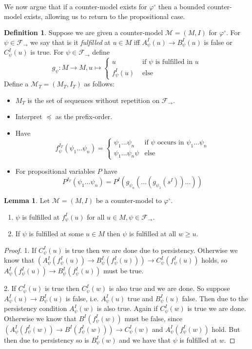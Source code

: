 \documentclass[a4paper,12pt]{report}
\theoremstyle{definition}
\theoremstyle{definition}
\theoremstyle{definition}
\newtheorem{lemma}[theorem]{Lemma}
\theoremstyle{definition}
\theoremstyle{definition}
\newtheorem{definition}[theorem]{Definition}
\theoremstyle{definition}
\theoremstyle{definition}
\begin{document}
	We now argue that if a counter-model exists for $\varphi^\circ$ then a bounded counter-model exists, allowing us to return to the propositional case.
	
	\begin{definition}
		Suppose we are given a counter-model $\mathcal M = (M, I)$ for $\varphi^\circ$. For $\psi\in\mathcal F_\to$ we say that is it \textit{fulfilled} at $u\in M$ iff $A_\psi^I(u)\to B_\psi^I(u)$ is false or $C_\psi^I(u)$ is true. For $\psi\in\mathcal F_\to$ define $$g_\psi : M\to M, u\mapsto\begin{cases}
			u&\text{ if $\psi$ is fulfilled in $u$}\\
			f^I_\psi(u)&\text{ else}		
		\end{cases}$$Define a $\mathcal M_T = (M_T, I_T)$ as follows:
	\begin{itemize}
		\item $M_T$ is the set of sequences without repetition on $\mathcal F_\to$.
		\item Interpret $\preceq$ as the prefix-order.
		\item Have $$f_\psi^{I_T}(\psi_1\dots\psi_n) = \begin{cases}
			\psi_1\dots\psi_n&\text{if $\psi$ occurs in $\psi_1\dots\psi_n$}\\
			\psi_1\dots\psi_n\psi&\text{else}			
		\end{cases}$$
		\item For propositional variables $P$ have $$P^{I_T}(\psi_1\dots \psi_n) = P^I(g_{\psi_n}(\dots(g_{\psi_1}(s^I))\dots))$$
	\end{itemize}
	\end{definition}
	\begin{lemma}
		Let $\mathcal M = (M, I)$ be a counter-model to $\mathcal \varphi^\circ$.
		\begin{enumerate}
			\item $\psi$ is fulfilled at $f_\psi^I(u)$ for all $u\in M, \psi\in\mathcal F_\to$.
			\item If $\psi$ is fulfilled at some $u\in M$ then $\psi$ is fulfilled at all $w\geq u$.
		\end{enumerate}
		
	\end{lemma}

	\begin{proof}
		1. If $C_\psi^I(u)$ is true then we are done due to persistency. Otherwise we know that $(A_\psi^I(f_\psi^I(u))\to B_\psi^I(f_\psi^I(u)))\to C_\psi^I(f_\psi^I(u))$ holds, so $A_\psi^I(f_\psi^I(u))\to B_\psi^I(f_\psi^I(u))$ must be true.
		
		2. If $C_\psi^I(u)$ is true then $C_\psi^I(w)$ is also true and we are done. So suppose $A_\psi^I(u)\to B_\psi^I(u)$ is false, i.e. $A_\psi^I(u)$ true and $B_\psi^I(u)$ false. Then due to the persistency condition $A_\psi^I(w)$ is also true. Again if $C_\psi^I(w)$ is true we are done. Otherwise we know that $B^I(f^I_\psi(w))$ must be false, since $(A^I_\psi(f^I_\psi(w))\to B^I(f^I_\psi(w)))\to C^I_\psi(w)$ and $A^I_\psi(f^I_\psi(w))$ hold. But then due to persistency so is $B^I_\psi(w)$ and we have that $\psi$ is fulfilled at $w$.
	\end{proof}
\end{document}
